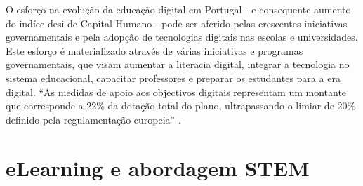 O esforço na evolução da educação digital em Portugal - e consequente aumento do indíce \acrshort{desi} de Capital Humano - pode ser aferido pelas crescentes iniciativas governamentais e pela adopção de tecnologias digitais nas escolas e universidades. Este esforço é materializado através de várias iniciativas e programas governamentais, que visam aumentar a literacia digital, integrar a tecnologia no sistema educacional, capacitar professores e preparar os estudantes para a era digital. ``As medidas de apoio aos objectivos digitais representam um montante que corresponde a 22\% da dotação total do plano, ultrapassando o limiar de 20\% definido pela regulamentação europeia'' \cite{Transicaodigitalprr}.

\section{eLearning e abordagem STEM} %
\label{sec:elearningstem}	%

